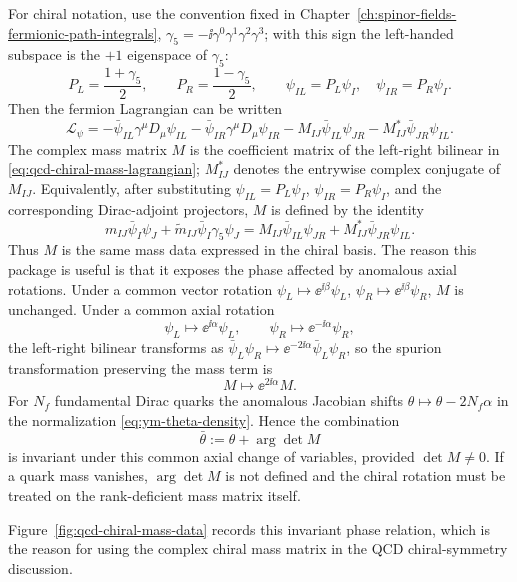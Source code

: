 For chiral notation, use the convention fixed in
Chapter~\ref{ch:spinor-fields-fermionic-path-integrals},
\(\gamma_5=-\ii\gamma^0\gamma^1\gamma^2\gamma^3\); with this sign the
left-handed subspace is the \(+1\) eigenspace of \(\gamma_5\):
\[
  P_L=\frac{1+\gamma_5}{2},
  \qquad
  P_R=\frac{1-\gamma_5}{2},
  \qquad
  \psi_{IL}=P_L\psi_I,\quad \psi_{IR}=P_R\psi_I.
\]
Then the fermion Lagrangian can be written
\begin{equation}
  \mathcal L_\psi
  =
  -\bar\psi_{IL}\gamma^\mu D_\mu\psi_{IL}
  -\bar\psi_{IR}\gamma^\mu D_\mu\psi_{IR}
  -M_{IJ}\bar\psi_{IL}\psi_{JR}
  -M^*_{IJ}\bar\psi_{JR}\psi_{IL}.
  \label{eq:qcd-chiral-mass-lagrangian}
\end{equation}
The complex mass matrix \(M\) is the coefficient matrix of the left-right
bilinear in \eqref{eq:qcd-chiral-mass-lagrangian}; \(M^*_{IJ}\) denotes the
entrywise complex conjugate of \(M_{IJ}\).  Equivalently, after substituting
\(\psi_{IL}=P_L\psi_I\), \(\psi_{IR}=P_R\psi_I\), and the corresponding
Dirac-adjoint projectors, \(M\) is defined by the identity
\[
  m_{IJ}\bar\psi_I\psi_J
  +\widetilde m_{IJ}\bar\psi_I\gamma_5\psi_J
  =
  M_{IJ}\bar\psi_{IL}\psi_{JR}
  +M^*_{IJ}\bar\psi_{JR}\psi_{IL}.
\]
Thus \(M\) is the same mass data expressed in the chiral basis.  The reason
this package is useful is that it exposes the phase affected by anomalous
axial rotations.  Under a common vector rotation
\(\psi_L\mapsto \ee^{\ii\beta}\psi_L\),
\(\psi_R\mapsto \ee^{\ii\beta}\psi_R\), \(M\) is unchanged.  Under a common
axial rotation
\[
  \psi_L\mapsto \ee^{\ii\alpha}\psi_L,
  \qquad
  \psi_R\mapsto \ee^{-\ii\alpha}\psi_R,
\]
the left-right bilinear transforms as
\(\bar\psi_L\psi_R\mapsto \ee^{-2\ii\alpha}\bar\psi_L\psi_R\), so the
spurion transformation preserving the mass term is
\[
  M\mapsto \ee^{2\ii\alpha}M .
\]
For \(N_f\) fundamental Dirac quarks the anomalous Jacobian shifts
\(\theta\mapsto\theta-2N_f\alpha\) in the normalization
\eqref{eq:ym-theta-density}.  Hence the combination
\[
  \bar\theta:=\theta+\arg\det M
\]
is invariant under this common axial change of variables, provided
\(\det M\neq0\).  If a quark mass vanishes, \(\arg\det M\) is not defined and
the chiral rotation must be treated on the rank-deficient mass matrix itself.

Figure~\ref{fig:qcd-chiral-mass-data} records this invariant phase relation,
which is the reason for using the complex chiral mass matrix in the QCD
chiral-symmetry discussion.

